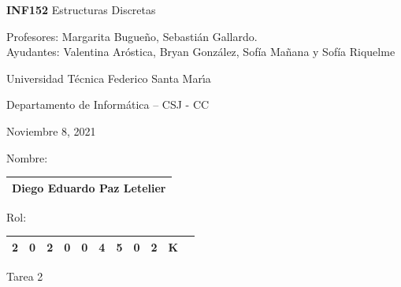 \documentclass[letterpaper,10pt]{article}
\begin{document}
\thispagestyle{empty}
 	
\begin{minipage}[t]{0.6\textwidth}

{\LARGE \textbf{INF152} Estructuras Discretas}

{\large Profesores: Margarita Bugueño, Sebastián Gallardo.}\\
{\large Ayudantes: Valentina Aróstica, Bryan González, Sofía Mañana y Sofía Riquelme}

Universidad T\'ecnica Federico Santa Mar\'{\i}a

Departamento de Inform\'atica -- CSJ - CC 

Noviembre 8, 2021

\end{minipage}
\hfill
\begin{minipage}[t]{0.3\textwidth}
Nombre:

\begin{tabular}{|c|}\hline
Diego Eduardo Paz Letelier\\\hline
\end{tabular}

\vspace{0.1cm}

Rol:

\begin{tabular}{|c|c|c|c|c|c|c|c|c|c|c|}\hline
2 & 0 & 2 & 0 & 0 & 4 & 5 & 0 & 2 & K &\\\hline
\end{tabular}
\end{minipage}

\vspace{0.3cm}

\begin{center}
    \huge Tarea 2
\end{center}
\end{document}
